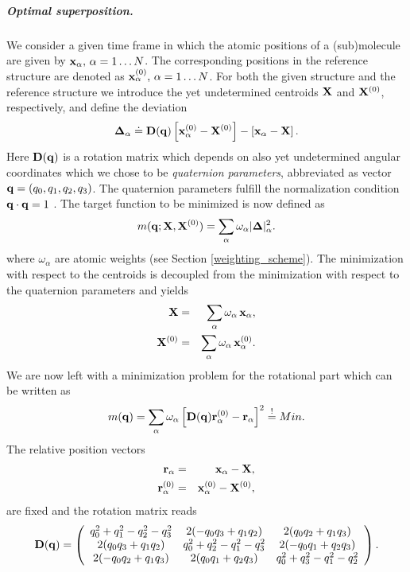 \documentclass[a4paper,11pt]{article}
\begin{document}
\subparagraph{Optimal superposition.} We consider a given time frame in which the atomic positions of a (sub)molecule are 
given by  ${\bf x}_\alpha,\,\alpha = 1\ldots N$. The corresponding positions in the reference structure are denoted as 
${\bf x}^{(0)}_\alpha,\,\alpha = 1\ldots N$. For both the given structure and the reference structure we introduce the yet 
undetermined centroids ${\bf X}$ and  ${\bf X}^{(0)}$, respectively, and define the deviation 
\begin{equation}
\label{eq:delta}
{\bf \Delta}_\alpha \doteq
{\bf D}({\bf q})\left[{\bf x}^{(0)}_\alpha - {\bf X}^{(0)}\right] -   
       \left[{\bf x}_\alpha - {\bf X}\right].   
\end{equation} 
Here ${\bf D}({\bf q})$ is a rotation matrix which depends on also yet undetermined angular coordinates which we chose to 
be {\em quaternion parameters}, abbreviated as vector ${\bf q} = (q_0,q_1,q_2,q_3)$. The quaternion parameters fulfill the 
normalization condition ${\bf q}\cdot{\bf q} = 1$ \cite{Altmann}. The target function to be minimized is now defined as
\begin{equation}
m({\bf q};{\bf X},{\bf X}^{(0)}) = 
\sum_\alpha \omega_\alpha |{\bf\Delta}|^2_\alpha.
\end{equation}
where $\omega_\alpha$ are atomic weights (see Section \ref{weighting_scheme}). The minimization with respect to the centroids 
is decoupled from the minimization with respect to the quaternion parameters and yields
\begin{eqnarray}
{\bf X}       &= &\sum_\alpha \omega_\alpha\,{\bf x}_\alpha,\\
{\bf X}^{(0)} &= &\sum_\alpha \omega_\alpha\,{\bf x}^{(0)}_\alpha.
\end{eqnarray} 
We are now left with a minimization problem for the rotational part which can be written as
\begin{equation}
\label{eq:minimize_rot}
m({\bf q}) = \sum_\alpha \omega_\alpha 
\left[{\bf D}({\bf q}){\bf r}^{(0)}_\alpha - {\bf r}_\alpha\right]^2
\stackrel{!}{=} Min.
\end{equation}
The relative position vectors
\begin{eqnarray}
{\bf r}_\alpha        &= &{\bf x}_\alpha - {\bf X},\\
{\bf r}^{(0)}_\alpha  &= &{\bf x}^{(0)}_\alpha - {\bf X}^{(0)},
\end{eqnarray} 
are fixed and the rotation matrix reads \cite{Altmann}
\begin{equation}
\label{eq:d_quat}
{\bf D}({\bf q}) = 
\left(
\begin{array}{ccc}
 q_0^2+q_1^2-q^2_2-q^2_3  &2(-q_0q_3+q_1q_2) &2(q_0q_2+q_1q_3) \\
 2(q_0q_3+q_1q_2)  &q_0^2+q_2^2-q^2_1-q^2_3  &2(-q_0q_1+q_2q_3)\\
 2(-q_0q_2+q_1q_3) &2(q_0q_1+q_2q_3)  &q_0^2+q_3^2-q^2_1-q^2_2  
\end{array}
\right).
\end{equation}
\end{document}
